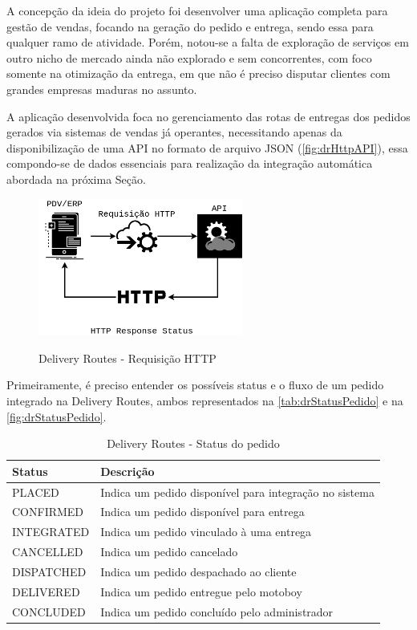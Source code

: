 A concepção da ideia do projeto foi desenvolver uma aplicação completa para gestão de vendas, focando na geração do pedido e entrega, sendo essa para qualquer ramo de atividade. Porém, notou-se a falta de exploração de serviços em outro nicho de mercado ainda não explorado e sem concorrentes, com foco somente na otimização da entrega, em que não é preciso disputar clientes com grandes empresas maduras no assunto.
 
A aplicação desenvolvida foca no gerenciamento das rotas de entregas dos pedidos gerados via sistemas de vendas já operantes, necessitando apenas da disponibilização de uma API no formato de arquivo JSON (\autoref{fig:drHttpAPI}), essa compondo-se de dados essenciais para realização da integração automática abordada na próxima Seção.
 
  \begin{figure}[H]
    \centering
    \caption{Delivery Routes - Requisição HTTP}
    \includegraphics[width=0.6\textwidth]{./dados/figuras/fig16}
    \label{fig:drHttpAPI}
\end{figure}

Primeiramente, é preciso entender os possíveis status e o fluxo de um pedido integrado na Delivery Routes, ambos representados na \autoref{tab:drStatusPedido} e na \autoref{fig:drStatusPedido}.

\begin{table}[H]
    \centering
    \caption{Delivery Routes - Status do pedido
    \label{tab:drStatusPedido}}
\begin{tabular}{ll}
\toprule
\textbf{Status} & \textbf{Descrição} \\
\midrule
PLACED & Indica um pedido disponível para integração no sistema \\
CONFIRMED & Indica um pedido disponível para entrega \\
INTEGRATED & Indica um pedido vinculado à uma entrega \\
CANCELLED & Indica um pedido cancelado \\
DISPATCHED & Indica um pedido despachado ao cliente \\
DELIVERED & Indica um pedido entregue pelo motoboy \\
CONCLUDED & Indica um pedido concluído pelo administrador \\
\bottomrule
\end{tabular}
\end{table}
 
